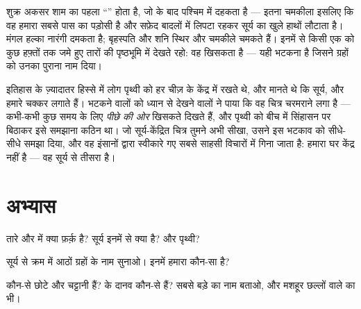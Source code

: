 \begin{example}[हमारे आकाश के भटकने वाले]\label{ex:g4:solar-system:wanderers}
शुक्र अकसर शाम का पहला ``'' होता है, जो  के बाद पश्चिम
में दहकता है --- इतना चमकीला इसलिए कि वह हमारा सबसे पास का पड़ोसी है
और सफ़ेद बादलों में लिपटा रहकर सूर्य का  खुले हाथों लौटाता है।
मंगल हल्का नारंगी दमकता है; बृहस्पति और शनि स्थिर और चमकीले चमकते
हैं। इनमें से किसी एक को कुछ हफ़्तों तक जमे हुए तारों की पृष्ठभूमि में
देखते रहो: वह खिसकता है --- यही भटकना है जिसने ग्रहों को उनका पुराना
नाम दिया।
\end{example}

\begin{remark}[एक पुराना चित्र, फिर से खींचा गया]\label{rem:g4:solar-system:history}
इतिहास के ज़्यादातर हिस्से में लोग पृथ्वी को हर चीज़ के केंद्र में
रखते थे, और मानते थे कि सूर्य,  और  हमारे चक्कर लगाते हैं।
भटकने वालों को ध्यान से देखने वालों ने पाया कि वह चित्र चरमराने लगा
है ---  कभी-कभी कुछ समय के लिए \emph{पीछे की ओर} खिसकते दिखते
हैं, और पृथ्वी को बीच में सिंहासन पर बिठाकर इसे समझाना कठिन था। जो
सूर्य-केंद्रित चित्र तुमने अभी सीखा, उसने इस भटकाव को सीधे-सीधे समझा
दिया, और वह इंसानों द्वारा स्वीकारे गए सबसे साहसी विचारों में गिना
जाता है: हमारा घर केंद्र नहीं है --- वह सूर्य से तीसरा  है।
\end{remark}

\section{अभ्यास}

\begin{exercise}[$\star$]\label{exo:g4:solar-system:1}
तारे और  में क्या फ़र्क़ है? सूर्य इनमें से क्या है? और पृथ्वी?
\end{exercise}

\begin{exercise}[$\star$]\label{exo:g4:solar-system:2}
सूर्य से क्रम में आठों ग्रहों के नाम सुनाओ। इनमें हमारा कौन-सा है?
\end{exercise}

\begin{exercise}[$\star$]\label{exo:g4:solar-system:3}
कौन-से  छोटे और चट्टानी हैं?  के दानव कौन-से हैं? सबसे बड़े का
नाम बताओ, और मशहूर छल्लों वाले का भी।
\end{exercise}

